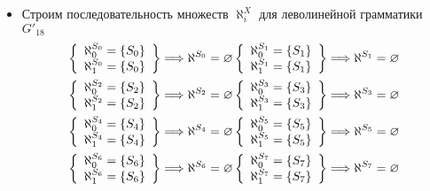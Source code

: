 \begin{itemize}
	\item Строим последовательность множеств \(\aleph_i^X\) для леволинейной грамматики \(G'_{18}\)
	      \begin{align*}
		      \setconc{
		      \aleph^{S_0}_{0}  = \cbr{S_0}                         \\
		      \aleph^{S_0}_{1}  = \cbr{S_0}                         \\
		      }{\aleph^{S_0}  = \varnothing}
		      \setconc{
		      \aleph^{S_1}_{0}  = \cbr{S_1}                         \\
		      \aleph^{S_1}_{1}  = \cbr{S_1}                         \\
		      }{\aleph^{S_1}  = \varnothing}                        \\
		      \setconc{
		      \aleph^{S_2}_{0}  = \cbr{S_2}                         \\
		      \aleph^{S_2}_{1}  = \cbr{S_2}                         \\
		      }{\aleph^{S_2}  = \varnothing}
		      \setconc{
		      \aleph^{S_3}_{0}  = \cbr{S_3}                         \\
		      \aleph^{S_3}_{1}  = \cbr{S_3}                         \\
		      }{\aleph^{S_3}  = \varnothing}                        \\
		      \setconc{
		      \aleph^{S_4}_{0}  = \cbr{S_4}                         \\
		      \aleph^{S_4}_{1}  = \cbr{S_4}                         \\
		      }{\aleph^{S_4}  = \varnothing}
		      \setconc{
		      \aleph^{S_5}_{0}  = \cbr{S_5}                         \\
		      \aleph^{S_5}_{1}  = \cbr{S_5}                         \\
		      }{\aleph^{S_5}  = \varnothing}                        \\
		      \setconc{
		      \aleph^{S_6}_{0}  = \cbr{S_6}                         \\
		      \aleph^{S_6}_{1}  = \cbr{S_6}                         \\
		      }{\aleph^{S_6}  = \varnothing}
		      \setconc{
		      \aleph^{S_7}_{0}  = \cbr{S_7}                         \\
		      \aleph^{S_7}_{1}  = \cbr{S_7}                         \\
		      }{\aleph^{S_7}  = \varnothing}                        \\

\end{align*}
\end{itemize}
